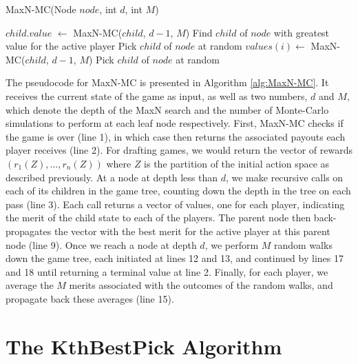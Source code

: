 \documentclass[letterpaper]{article}
\numberwithin{equation}{section}
\numberwithin{theorem}{section}
\numberwithin{lemma}{section}
\numberwithin{df}{section}
\begin{document}
\begin{algorithm}[htb]
	\caption{MaxN-MC(Node $node$, int $d$, int $M$)}
	\label{alg:MaxN-MC}
	\begin{algorithmic}[1]
		\ENDIF
				\STATE $child.value$ $\gets$ MaxN-MC($child$, $d - 1$, $M$)
			\ENDFOR
			\STATE Find $child$ of $node$ with greatest value for the active player
				\STATE Pick $child$ of $node$ at random
				\STATE $values(i) \gets $ MaxN-MC($child$, $d-1$, $M$)
			\ENDFOR
		\ELSE
			\STATE Pick $child$ of $node$ at random
		\ENDIF
	\end{algorithmic}
\end{algorithm}

The pseudocode for MaxN-MC is presented in Algorithm \ref{alg:MaxN-MC}.  It receives the current state of the game as input, as well as two numbers, $d$ and $M$, which denote the depth of the MaxN search and the number of Monte-Carlo simulations to perform at each leaf node respectively.  First, MaxN-MC checks if the game is over (line 1), in which case then returns the associated payouts each player receives (line 2).  For drafting games, we would return the vector of rewards $(r_1(Z), ..., r_n(Z))$ where $Z$ is the partition of the initial action space as described previously.  At a node at depth less than $d$, we make recursive calls on each of its children in the game tree, counting down the depth in the tree on each pass (line 3).  Each call returns a vector of values, one for each player, indicating the merit of the child state to each of the players.  The parent node then back-propagates the vector with the best merit for the active player at this parent node (line 9).  Once we reach a node at depth $d$, we perform $M$ random walks down the game tree, each initiated at lines 12 and 13, and continued by lines 17 and 18 until returning a terminal value at line 2.  Finally, for each player, we average the $M$ merits associated with the outcomes of the random walks, and propagate back these averages (line 15).



 
\section{The KthBestPick Algorithm}
\end{document}

